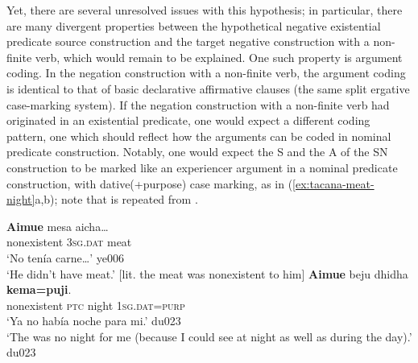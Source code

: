 \documentclass[output=paper]{langsci/langscibook}
\begin{document}
Yet, there are several unresolved issues with this hypothesis; in
particular, there are many divergent properties between the hypothetical
negative existential predicate source construction and the target negative
construction with a non-finite verb, which would remain to be explained.
One such property is argument coding.  In the negation construction with a
non-finite verb, the argument coding is identical to that of basic
declarative affirmative clauses (the same split ergative case-marking
system). If the negation construction with a
non-finite verb had originated in an existential predicate, one would
expect a different coding pattern, one which should reflect how the
arguments can be coded in nominal predicate construction. Notably, one
would expect the S and the A of the SN construction to be marked like an
experiencer argument in a nominal predicate construction, with
dative(+purpose) case marking, as in (\ref{ex:tacana-meat-night}a,b);
note that  is repeated from .
%
\begin{exe}\ex\label{ex:tacana-meat-night}
\begin{xlist}
\ex\label{ex:tacana-still-no-meat}
\gll 
  \textbf{Aimue}
  mesa
  aicha…\\
    nonexistent  \textsc{3sg.dat}  meat\\
\glt `No tenía carne…' ye006\\
`He didn't have meat.' [lit. the meat was nonexistent to him]
\ex\label{ex:tacana-no-night}
\gll  \textbf{Aimue}  beju  dhidha  \textbf{kema=puji}.\\
    nonexistent  \textsc{ptc}  night  1\textsc{sg.dat=purp}\\
\glt `Ya no había noche para mi.' du023\\
`The was no night for me (because I could see at night as well as during the day).' du023
\end{xlist}\end{exe}
\end{document}
